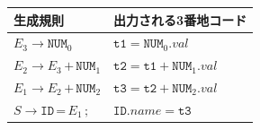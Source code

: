 \documentclass[dvipdfmx]{jarticle}
\begin{document}
\begin{tabularx}{.7\textwidth}{XX}
  生成規則 & 出力される3番地コード\\\hline
  $E_3\rightarrow\texttt{NUM}_0$ & $\texttt{t1}=\texttt{NUM}_0.val$\\
  $E_2\rightarrow E_3\,\texttt{+}\,\texttt{NUM}_1$ &
  $\texttt{t2}=\texttt{t1}+\texttt{NUM}_1.val$\\
  $E_1\rightarrow E_2\,\texttt{+}\,\texttt{NUM}_2$ &
  $\texttt{t3}=\texttt{t2}+\texttt{NUM}_2.val$\\
  $S\rightarrow\texttt{ID}\,\texttt{=}\,E_1\,\texttt{;}$ &
  $\texttt{ID}.name=\texttt{t3}$
\end{tabularx}
\end{document}
